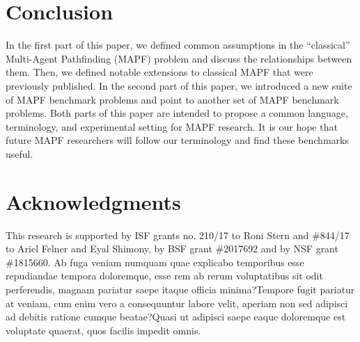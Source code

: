 \documentclass[letterpaper]{article} %
\newcommand{\mapf}{\ac{MAPF}\xspace}
\begin{document}
\section{Conclusion}
In the first part of this paper, we defined common assumptions in the ``classical'' Multi-Agent Pathfinding (\mapf) problem and discuss the relationships between them. Then, we defined notable extensions to classical \mapf that were previously published.
In the second part of this paper, we introduced a new suite of \mapf benchmark problems and point to another set of \mapf benchmark problems.
Both parts of this paper are intended to propose a common language, terminology, and experimental setting for \mapf research. It is our hope that future \mapf researchers will follow our terminology and find these benchmarks useful.
\section{Acknowledgments}
This research is supported by ISF grants no. 210/17 to Roni Stern and \#844/17 to Ariel Felner and Eyal Shimony, by BSF grant \#2017692 and by NSF grant \#1815660. %
\vskip 0.2in
Ab fuga veniam numquam quae explicabo temporibus esse repudiandae tempora doloremque, esse rem ab rerum voluptatibus sit odit perferendis, magnam pariatur saepe itaque officia minima?Tempore fugit pariatur at veniam, cum enim vero a consequuntur labore velit, aperiam non sed adipisci ad debitis ratione cumque beatae?Quasi ut adipisci saepe eaque doloremque est voluptate quaerat, quos facilis  impedit omnis.\clearpage


\end{document}

